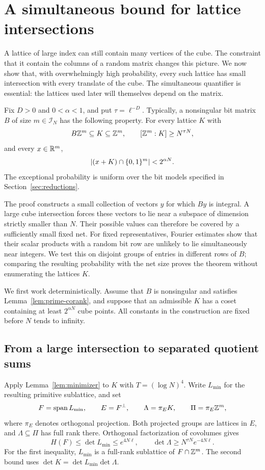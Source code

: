 \section{A simultaneous bound for lattice intersections}\label{sec:lattice}

A lattice of large index can still contain many vertices of the cube.
The constraint that it contain the columns of a random matrix changes
this picture.  We now show that, with overwhelmingly high probability,
every such lattice has small intersection with every translate of the
cube.  The simultaneous quantifier is essential: the lattices used later
will themselves depend on the matrix.

\begin{theorem}\label{thm:small-intersection}
Fix $D>0$ and $0<\alpha<1$, and put $\tau=\ell^{-D}$.
Typically, a nonsingular bit matrix $B$ of size $m\in\mathcal I_N$ has the
following property.  For every lattice $K$ with
\[
 B\mathbb Z^m\subseteq K\subseteq\mathbb Z^m,
 \qquad [\mathbb Z^m:K]\ge N^{\tau N},
\]
and every $x\in\mathbb R^m$,
\[
 |(x+K)\cap\{0,1\}^m|<2^{\alpha N}.
\]
The exceptional probability is uniform over the bit models specified
in Section~\ref{sec:reductions}.
\end{theorem}

The proof constructs a small collection of vectors $y$ for which $By$
is integral.  A large cube intersection forces these vectors to lie
near a subspace of dimension strictly smaller than $N$.  Their possible
values can therefore be covered by a sufficiently small fixed net.
For fixed representatives, Fourier estimates show that their scalar
products with a random bit row are unlikely to lie simultaneously near
integers.  We test this on disjoint groups of entries in different rows
of $B$; comparing the resulting probability with the net size proves
the theorem without enumerating the lattices $K$.

We first work deterministically.  Assume that $B$ is nonsingular and
satisfies Lemma~\ref{lem:prime-corank}, and suppose that an admissible
$K$ has a coset containing at least $2^{\alpha N}$ cube points.
All constants in the construction are fixed before $N$ tends to
infinity.

\subsection{From a large intersection to separated quotient sums}

Apply Lemma~\ref{lem:minimizer} to $K$ with $T=(\log N)^4$.
Write $L_{\min}$ for the resulting primitive sublattice, and set
\[
 F=\operatorname{span} L_{\min},\qquad E=F^\perp,\qquad
 \Lambda=\pi_E K,\qquad \Pi=\pi_E\mathbb Z^m,
\]
where $\pi_E$ denotes orthogonal projection.  Both projected groups are
lattices in $E$, and $\Lambda\subseteq\Pi$ has full rank there.
Orthogonal factorization of covolumes gives
\begin{equation}\label{eq:lattice-height-index}
 H(F)\le\det L_{\min}\le e^{4N\ell},
 \qquad
 \det\Lambda\ge N^{\tau N}e^{-4N\ell}.
\end{equation}
For the first inequality, $L_{\min}$ is a full-rank sublattice of
$F\cap\mathbb Z^m$.  The second bound uses
$\det K=\det L_{\min}\det\Lambda$.

